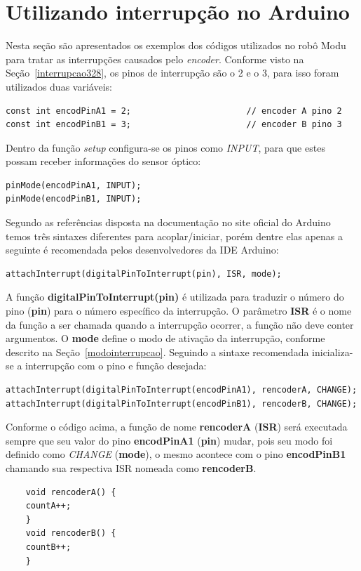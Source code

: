 \documentclass[a4paper,12pt,portuguese]{ufms-cpcx}
\begin{document}
\section{Utilizando interrupção no Arduino}\label{usointerrupcao}
Nesta seção são apresentados os exemplos dos códigos utilizados no robô Modu para tratar as interrupções causados pelo \textit{encoder}. Conforme visto na Seção~\ref{interrupcao328}, os pinos de interrupção são o 2 e o 3, para isso foram utilizados duas variáveis:
\begin{lstlisting}
const int encodPinA1 = 2;                       // encoder A pino 2
const int encodPinB1 = 3;                       // encoder B pino 3
\end{lstlisting}
Dentro da função \textit{setup} configura-se os pinos como \textit{INPUT}, para que estes possam receber informações do sensor óptico:
\begin{lstlisting}
pinMode(encodPinA1, INPUT);
pinMode(encodPinB1, INPUT);
\end{lstlisting}
Segundo as referências disposta na documentação no site oficial do Arduino temos três sintaxes diferentes para acoplar\//iniciar, porém dentre elas apenas a seguinte é recomendada pelos desenvolvedores da IDE Arduino:
\begin{lstlisting}
attachInterrupt(digitalPinToInterrupt(pin), ISR, mode);
\end{lstlisting}
A função \textbf{digitalPinToInterrupt(pin)} é utilizada para traduzir o número do pino (\textbf{pin}) para o número específico da interrupção. O parâmetro \textbf{ISR} é o nome da função a ser chamada quando a interrupção ocorrer, a função não deve conter argumentos. O \textbf{mode} define o modo de ativação da interrupção, conforme descrito na Seção~\ref{modointerrupcao}.
Seguindo a sintaxe recomendada inicializa-se a interrupção com o pino e função desejada:
\begin{lstlisting}
attachInterrupt(digitalPinToInterrupt(encodPinA1), rencoderA, CHANGE);
attachInterrupt(digitalPinToInterrupt(encodPinB1), rencoderB, CHANGE);
\end{lstlisting}

Conforme o código acima, a função de nome \textbf{rencoderA} (\textbf{ISR}) será executada sempre que seu valor do pino \textbf{encodPinA1} (\textbf{pin}) mudar, pois seu modo foi definido como \textit{CHANGE} (\textbf{mode}), o mesmo acontece com o pino \textbf{encodPinB1} chamando sua respectiva ISR nomeada como \textbf{rencoderB}.

\begin{lstlisting}
	void rencoderA() {
	countA++;
	}
	void rencoderB() {
	countB++;
	}
\end{lstlisting}
\end{document}
